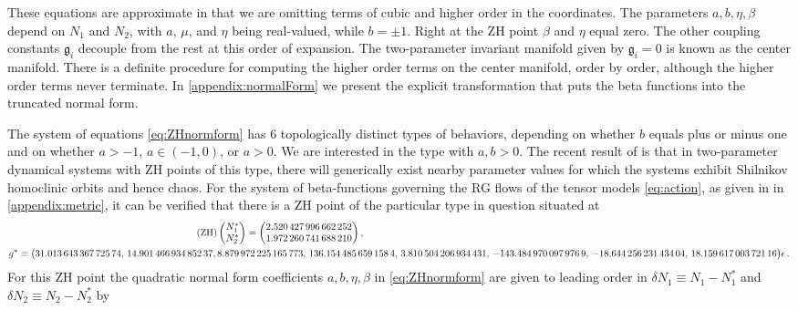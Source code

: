 These equations are approximate in that we are omitting terms of cubic and higher order in the coordinates. The parameters $a,b,\eta,\beta$ depend on $N_1$ and $N_2$, with $a$, $\mu$, and $\eta$ being real-valued, while $b=\pm 1$. Right at the ZH point $\beta$ and $\eta$ equal zero. The other coupling constants $\mathfrak{g}_i$ decouple from the rest at this order of expansion. The two-parameter invariant manifold given by $\mathfrak{g}_i=0$ is known as the center manifold. There is a definite procedure for computing the higher order terms on the center manifold, order by order, although the higher order terms never terminate. In \cref{appendix:normalForm} we present the explicit transformation that puts the beta functions into the truncated normal form. 



The system of equations \cref{eq:ZHnormform} has 6 topologically distinct types of behaviors, depending on whether $b$ equals plus or minus one and on whether $a>-1$, $a\in (-1,0)$, or $a>0$. We are interested in the type with $a,b>0$. The recent result of \cite{baldoma2020hopf} is that in two-parameter dynamical systems with ZH points of this type, there will generically exist nearby parameter values for which the systems exhibit Shilnikov homoclinic orbits and hence chaos. For the system of beta-functions governing the RG flows of the tensor models \cref{eq:action}, as given in  in \cref{appendix:metric}, it can be verified that there is a ZH point of the particular type in question situated at 
\begin{align}\label{eq:ZH}\tag{ZH}
&        \begin{pmatrix*}[r]
        N_1^* \\
        N_2^*
    \end{pmatrix*}= \begin{pmatrix*}[r]
        \num{2.520427996662252} \\
        \num{1.972260741688210} 
    \end{pmatrix*},
    \vspace{3mm}
    \\
    g^\ast \equiv
\big(
    \num{31.01364336772574},\,
    \num{14.90146693485237},\,&
    \num{8.879972225165773},\,
    \num{136.1544856591584},\,
    \num{3.810504206934431},\,
    \num{-143.4849700979769},\,
    \num{-18.64425623143404},\,
    \num{18.15961700372116}
    \big) \epsilon\,.
    \nonumber
\end{align}
For this ZH point the quadratic normal form coefficients $a,b,\eta,\beta$ in \cref{eq:ZHnormform} are given to leading order in $\delta N_1 \equiv N_1-N_1^\ast$ and $\delta N_2 \equiv N_2-N_2^\ast$ by 
